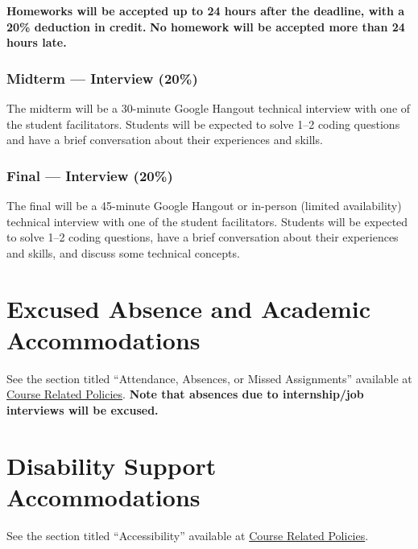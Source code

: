 \documentclass[12pt]{article}
\begin{document}
\textbf{Homeworks will be accepted up to 24 hours after the deadline, with a 20\% deduction in credit.}
\textbf{No homework will be accepted more than 24 hours late.}

\subsubsection*{Midterm --- Interview (20\%)}
The midterm will be a 30-minute Google Hangout technical interview with one of the student facilitators.
Students will be expected to solve 1--2 coding questions and have a brief conversation about their experiences and skills.

\subsubsection*{Final --- Interview (20\%)}
The final will be a 45-minute Google Hangout or in-person (limited availability) technical interview with one of the student facilitators.
Students will be expected to solve 1--2 coding questions, have a brief conversation about their experiences and skills, and discuss some technical concepts.



\section*{Excused Absence and Academic Accommodations}
See the section titled ``Attendance, Absences, or Missed Assignments'' available at \href{https://www.ugst.umd.edu/courserelatedpolicies.html}{Course Related Policies}.
\textbf{Note that absences due to internship/job interviews will be excused.}

\section*{Disability Support Accommodations}
See the section titled ``Accessibility'' available at \href{https://www.ugst.umd.edu/courserelatedpolicies.html}{Course Related Policies}.
\end{document}
